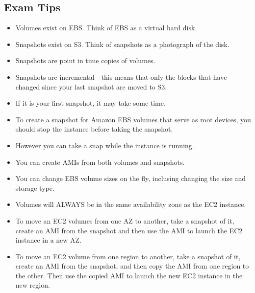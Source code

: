\documentclass{article}
\begin{document}
\subsection{Exam Tips}
\begin{itemize}
\item
Volumes exist on EBS. Think of EBS as a virtual hard disk.

\item
Snapshots exist on S3. Think of snapshots as a photograph of the disk.

\item
Snapshots are point in time copies of volumes.

\item
Snapshots are incremental - this means that only the blocks that have changed since your last snapshot are moved to S3.

\item
If it is your first snapshot, it may take some time.

\item
To create a snapshot for Amazon EBS volumes that serve as root devices, you should stop the instance before taking the snapshot.

\item
However you can take a snap while the instance is running.

\item
You can create AMIs from both volumes and snapshots.

\item
You can change EBS volume sizes on the fly, inclusing changing the size and storage type.

\item
Volumes will ALWAYS be in the same availability zone as the EC2 instance.

\item
To move an EC2 volumes from one AZ to another, take a snapshot of it, create an AMI from the snapshot and then use the AMI to launch the EC2 instance in a new AZ.

\item
To move an EC2 volume from one region to another, take a snapshot of it, create an AMI from the snapshot, and then copy the AMI from one region to the other. Then use the copied AMI to launch the new EC2 instance in the new region.
\end{itemize}
\end{document}
